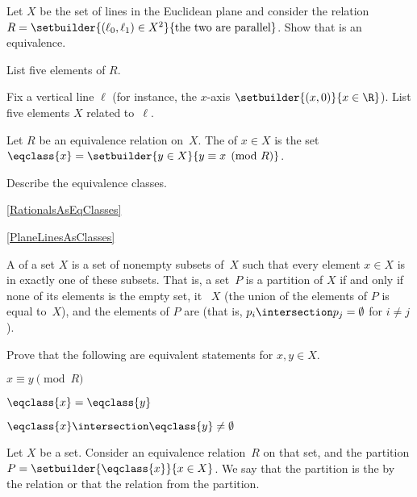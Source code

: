 \documentclass{ibl}
\begin{document}
\begin{ex} \label{PlaneLinesAsClasses}
\begin{exes}
\item Let $X$ be the set of lines in the Euclidean plane and consider
the relation
$R=\setbuilder{(\ell_0,\ell_1)\in X^2}{\text{the two are parallel}}$. 
Show that is an equivalence.
\item List five elements of $R$.
\item Fix a vertical line $\ell$ (for instance, the $x$-axis 
  $\setbuilder{(x,0)}{x\in\R}$).
  List five elements $X$ related to~$\ell$.
\end{exes}
\end{ex}

\begin{df}
Let $R$ be an equivalence relation on~$X$.
The  of $x\in X$ is the set
$\eqclass{x}=\setbuilder{y\in X}{y\equiv x\pmod R}$.   
\end{df}

\begin{ex} Describe the equivalence classes.
\begin{exes}
\item \cref{RationalsAsEqClasses}
\item \cref{PlaneLinesAsClasses}
\end{exes}
\end{ex}

\begin{df}
A  of a set $X$ is a 
set of nonempty subsets of~$X$ such that every element $x\in X$ 
is in exactly one of these subsets.
That is, a set~$P$ is a partition of $X$ if and only if 
none of its elements is the empty set,
it ~$X$
(the union of the elements of $P$ is equal to~$X$),
and the elements of $P$ are 
(that is, $p_i\intersection p_j=\emptyset$ for $i\neq j$).
\end{df}

\begin{ex} Prove that the following are equivalent statements for $x,y\in X$.
\begin{exes}
\item $x\equiv y\pmod R$
\item $\eqclass{x}=\eqclass{y}$    
\item $\eqclass{x}\intersection\eqclass{y}\neq \emptyset$
\end{exes}
\end{ex}

Let $X$ be a set. Consider an equivalence relation~$R$ on that set, 
and the partition $P=\setbuilder{\eqclass{x}}{x\in X}$.
We say that the partition is  
the  by the relation or that
the relation  from the partition. 
\end{document}
